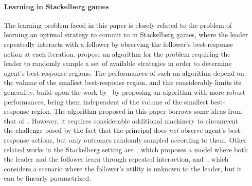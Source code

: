 \paragraph{Learning in Stackelberg games}
%
The learning problem faced in this paper is closely related to the problem of learning an optimal strategy to commit to in Stackelberg games, where the leader repeatedly interacts with a follower by observing the follower's best-response action at each iteration.
%
\citet{letchford2009learning} propose an algorithm for the problem requiring the leader to randomly sample a set of available strategies in order to determine agent's best-response regions.
%
The performances of such an algorithm depend on the volume of the smallest best-response region, and this considerably limits its generality.
%
\citet{Peng2019} build upon the work by~\citet{letchford2009learning} by proposing an algorithm with more robust performances, being them independent of the volume of the smallest best-response region.
%
The algorithm proposed in this paper borrows some ideas from that of~\citet{Peng2019}.
%
However, it requires considerable additional machinery to circumvent the challenge posed by the fact that the principal does \emph{not} observe agent's best-response actions, but only outcomes randomly sampled according to them.
%
%
%
%
Other related works in the Stackelberg setting are~\citep{bai2021sample}, which proposes a model where both the leader and the follower learn through repeated interaction, and~\citep{lauffer2022noregret}, which considers a scenario where the follower’s utility is unknown to the leader, but it can be linearly parametrized.
